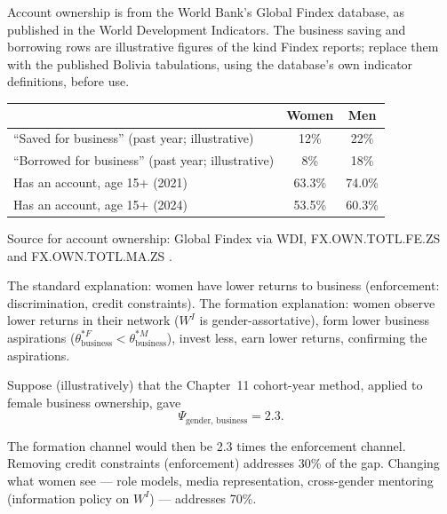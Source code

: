 \documentclass[../structural_economics_book.tex]{subfiles}
\begin{document}
\begin{example}\label{ch18:ex:gender_aspiration}
Account ownership is from the World Bank's Global Findex database, as published in the World Development Indicators. The business saving and borrowing rows are illustrative figures of the kind Findex reports; replace them with the published Bolivia tabulations, using the database's own indicator definitions, before use.
\begin{center}
\begin{tabular}{lcc}
\toprule
& Women & Men \\
\midrule
``Saved for business'' (past year; illustrative) & 12\% & 22\% \\
``Borrowed for business'' (past year; illustrative) & 8\% & 18\% \\
Has an account, age 15+ (2021) & 63.3\% & 74.0\% \\
Has an account, age 15+ (2024) & 53.5\% & 60.3\% \\
\bottomrule
\end{tabular}
\par\footnotesize Source for account ownership: Global Findex via WDI, FX.OWN.TOTL.FE.ZS and FX.OWN.TOTL.MA.ZS \citep{worldbank2026wdi}.
\end{center}

The standard explanation: women have lower returns to business (enforcement: discrimination, credit constraints). The formation explanation: women observe lower returns in their network ($W^I$ is gender-assortative), form lower business aspirations ($\theta^{*F}_{\text{business}} < \theta^{*M}_{\text{business}}$), invest less, earn lower returns, confirming the aspirations.

Suppose (illustratively) that the Chapter~11 cohort-year method, applied to female business ownership, gave
\begin{equation}
\Psi_{\text{gender, business}} = 2.3.
\end{equation}

The formation channel would then be 2.3 times the enforcement channel. Removing credit constraints (enforcement) addresses 30\% of the gap. Changing what women see --- role models, media representation, cross-gender mentoring (information policy on $W^I$) --- addresses 70\%.
\end{example}


\end{document}
